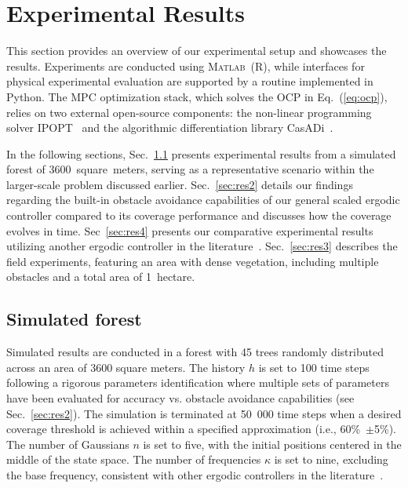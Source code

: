 \documentclass[letterpaper, 10 pt, conference, twoside]{IEEEtran}
\theoremstyle{definition}
\begin{document}
\section{Experimental Results}\label{sec:res}
\noindent
This section provides an overview of our experimental setup and showcases the results. 
Experiments are conducted using \textsc{Matlab}~(R), while interfaces for physical experimental evaluation are supported by a routine implemented in Python. The MPC optimization stack, which solves the OCP in Eq.~(\ref{eq:ocp}), relies on two external open-source components: the non-linear programming solver IPOPT~\cite{wachter2006implementation} and the algorithmic differentiation library CasADi~\cite{andersson2012casadi}.

In the following sections, Sec.~\ref{sec:res1} presents experimental results from a simulated forest of 3600~square~meters, serving as a representative scenario within the larger-scale problem discussed earlier. 
Sec.~\ref{sec:res2} details our findings regarding the built-in obstacle avoidance capabilities of our general scaled ergodic controller compared to its coverage performance and discusses how the coverage evolves in time. Sec~\ref{sec:res4} presents our comparative experimental results utilizing another ergodic controller in the literature~\cite{calinon2020mixture}. Sec.~\ref{sec:res3} describes the %
field experiments, featuring an area with dense vegetation, including multiple obstacles and a total area of 1~hectare.

\subsection{Simulated forest}\label{sec:res1}
\noindent
Simulated results are conducted in a forest with 45 trees randomly distributed across an area of 3600 square meters. The history $h$ is set to 100 time steps following a rigorous parameters identification where multiple sets of parameters have been evaluated for accuracy vs. obstacle avoidance capabilities (see Sec.~\ref{sec:res2}). The simulation is terminated at 50~000 time steps when a desired coverage threshold is achieved within a specified approximation (i.e., 60\%~$\pm$5\%). The number of Gaussians $n$ is set to five, with the initial positions centered in the middle of the state space. The number of frequencies $\kappa$ is set to nine, excluding the base frequency, consistent with other ergodic controllers in the literature~\cite{seewald2024energy,calinon2020mixture,dong2023time}. 
\end{document}
